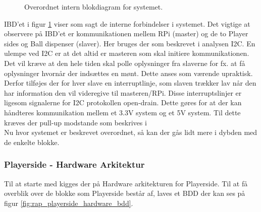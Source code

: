 \documentclass[Rapport/Rapport_main.tex]{subfiles}
\begin{document}
\begin{figure}[H]
    \centering
    \caption{Overordnet intern blokdiagram for systemet.}
    \label{fig:rap_overall_hardware_ibd}
\end{figure}
IBD'et i figur \ref{fig:rap_overall_hardware_ibd} viser som sagt de interne forbindelser i systemet. Det vigtige at observere på IBD'et er kommunikationen mellem RPi (master) og de to Player sides og Ball dispenser (slaver). Her bruges der som beskrevet i analysen I2C. En ulempe ved I2C er at det altid er masteren som skal initiere kommunikationen. Det vil kræve at den hele tiden skal polle oplysninger fra slaverne for fx. at få oplysninger hvornår der indsættes en mønt. Dette anses som værende upraktisk. Derfor tilføjes der for hver slave en interruptlinje,  som slaven trækker lav når den har information den vil videregive til masteren/RPi. Disse interruptslinjer er ligesom signalerne for I2C protokollen open-drain. Dette gøres for at der kan håndteres kommunikation mellem et 3.3V system og et 5V system. Til dette kræves der pull-up modstande som beskrives i  \\
Nu hvor systemet er beskrevet overordnet, så kan der gås lidt mere i dybden med de enkelte blokke.
\subsubsection{Playerside - Hardware Arkitektur}
Til at starte med kigges der på Hardware arkitekturen for Playerside. Til at få overblik over de blokke som Playerside består af, laves et BDD der kan ses på figur \ref{fig:rap_playerside_hardware_bdd}.
\end{document}
